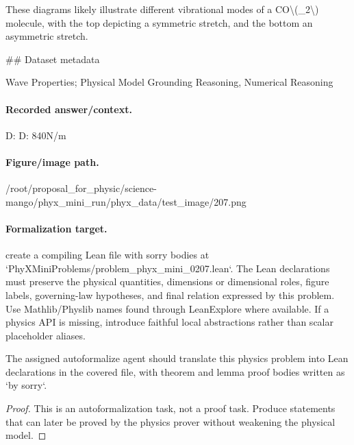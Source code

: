 These diagrams likely illustrate different vibrational modes of a CO\textbackslash{}(\_2\textbackslash{}) molecule, with the top depicting a symmetric stretch, and the bottom an asymmetric stretch.

\#\# Dataset metadata

Wave Properties; Physical Model Grounding Reasoning, Numerical Reasoning

\paragraph{Recorded answer/context.}
D: D: 840N/m

\paragraph{Figure/image path.}
/root/proposal\_for\_physic/science-mango/phyx\_mini\_run/phyx\_data/test\_image/207.png

\paragraph{Formalization target.}
create a compiling Lean file with sorry bodies at `PhyXMiniProblems/problem\_phyx\_mini\_0207.lean`. The Lean declarations must preserve the physical quantities, dimensions or dimensional roles, figure labels, governing-law hypotheses, and final relation expressed by this problem.
Use Mathlib/Physlib names found through LeanExplore where available. If a physics API is missing, introduce faithful local abstractions rather than scalar placeholder aliases.

\begin{theorem}
\label{thm:physics:phyx_mini_0207:target}
The assigned autoformalize agent should translate this physics problem into Lean declarations in the covered file, with theorem and lemma proof bodies written as `by sorry`.
\end{theorem}
\begin{proof}
This is an autoformalization task, not a proof task. Produce statements that can later be proved by the physics prover without weakening the physical model.
\end{proof}


